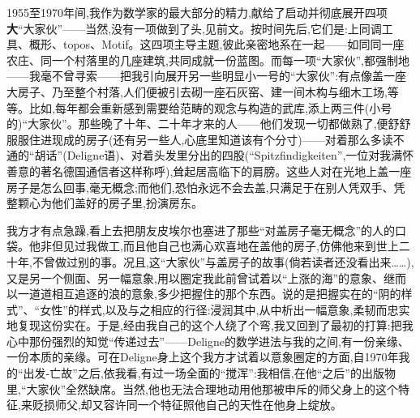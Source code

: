 1955至1970年间,我作为数学家的最大部分的精力,献给了启动并彻底展开四项\textbf{大}“大家伙”——当然,没有一项做到了头,见前文。按时间先后,它们是:上同调工具、概形、topos、Motif。这四项主导主题,彼此亲密地系在一起\dmark{}——如同同一座农庄、同一个村落里的几座建筑,共同成就一份蓝图。而每一项“大家伙”,都强制地——我毫不曾寻索——把我引向展开另一些明显小一号的“大家伙”:有点像盖一座大房子、乃至整个村落,人们便被引去砌一座石灰窑、建一间木构与细木工场,等等。比如,每年都会重新感到需要给范畴的观念与构造的武库,添上两三件(小号的)“大家伙”。那些晚了十年、二十年才来的人——他们发现一切都做熟了,便舒舒服服住进现成的房子(还有另一些人,心底里知道该有个分寸)——对着那么多读不通的“胡话”(Deligne语)、对着头发里分出的四股(“Spitzfindigkeiten”,一位对我满怀善意的著名德国通信者这样称呼),耸起居高临下的肩膀。这些人对在光地上盖一座房子是怎么回事,毫无概念;而他们,恐怕永远不会去盖,只满足于在别人凭双手、凭整颗心为他们盖好的房子里,扮演房东。

\dmark{}我方才有点急躁,看上去把朋友皮埃尔也塞进了那些“对盖房子毫无概念”的人的口袋。他非但见过我做工,而且他自己也满心欢喜地在盖他的房子,仿佛他来到世上二十年,不曾做过别的事。况且,这“大家伙”与盖房子的故事(倘若读者还没看出来……),又是另一个侧面、另一幅意象,用以圈定我此前曾试着以“上涨的海”的意象、继而以一道道相互追逐的浪的意象,多少把握住的那个东西。说的是把握实在的“阴的样式”、“女性”的样式,以及与之相应的行径:浸润其中,从中析出一幅意象,柔韧而忠实地复现这份实在。于是,经由我自己的这个人绕了个弯,我又回到了最初的打算:把我心中那份强烈的知觉“传递过去”——Deligne的数学进法与我的之间,有一份亲缘、一份本质的亲缘。可在Deligne身上这个我方才试着以意象圈定的方面,自1970年我的“出发-亡故”之后,依我看,有过一场全面的“搅浑”:我相信,在他“之后”的出版物里,“大家伙”全然缺席。当然,他也无法合理地动用他那被申斥的师父身上的这个特征,来贬损师父,却又容许同一个特征照他自己的天性在他身上绽放。

